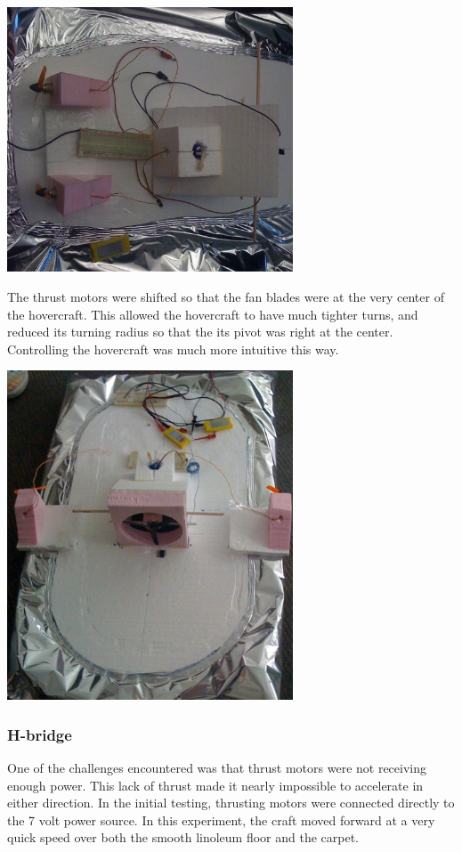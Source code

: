 \begin{center}
  \includegraphics[width=85mm]{imageSources/turningPivot1.png}
\end{center}
\label{turningPivot1}

The thrust motors were shifted so that the fan blades were at the very center of the hovercraft. This allowed the hovercraft to have much tighter turns, and reduced its turning radius so that the its pivot was right at the center. Controlling the hovercraft was much more intuitive this way.

\begin{center}
  \includegraphics[width=85mm]{imageSources/turningPivot2.png}
\end{center}
\label{turningPivot2}

\subsubsection{H-bridge}
One of the challenges encountered was that thrust motors were not receiving enough power. This lack of thrust made it nearly impossible to accelerate in either direction. In the initial testing, thrusting motors were connected directly to the 7 volt power source. In this experiment, the craft moved forward at a very quick speed over both the smooth linoleum floor and the carpet.

